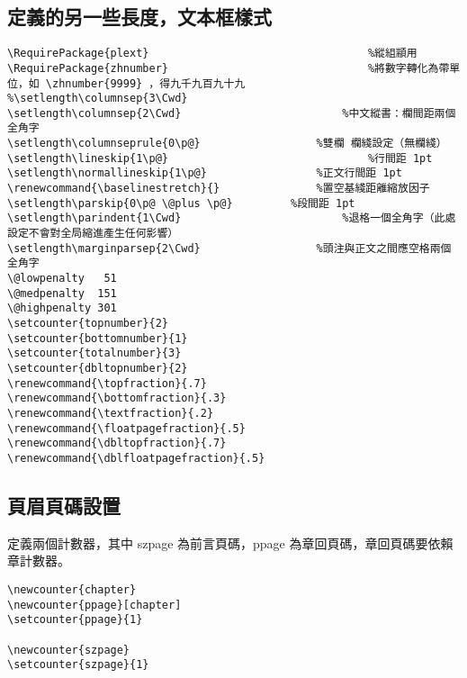 \subsection{定義的另一些長度，文本框樣式}

\begin{lstlisting}[firstnumber=325]
\RequirePackage{plext}									%縱組顓用
\RequirePackage{zhnumber}								%將數字轉化為帶單位，如 \zhnumber{9999} ，得九千九百九十九
%\setlength\columnsep{3\Cwd}
\setlength\columnsep{2\Cwd}							%中文縱書：欄間距兩個全角字
\setlength\columnseprule{0\p@}					%雙欄 欄綫設定（無欄綫）
\setlength\lineskip{1\p@}								%行間距 1pt
\setlength\normallineskip{1\p@}					%正文行間距 1pt
\renewcommand{\baselinestretch}{}				%置空基綫距離縮放因子
\setlength\parskip{0\p@ \@plus \p@}			%段間距 1pt
\setlength\parindent{1\Cwd}							%退格一個全角字（此處設定不會對全局縮進產生任何影響）
\setlength\marginparsep{2\Cwd}					%頭注與正文之間應空格兩個全角字
\@lowpenalty   51
\@medpenalty  151
\@highpenalty 301
\setcounter{topnumber}{2}
\setcounter{bottomnumber}{1}
\setcounter{totalnumber}{3}
\setcounter{dbltopnumber}{2}
\renewcommand{\topfraction}{.7}
\renewcommand{\bottomfraction}{.3}
\renewcommand{\textfraction}{.2}
\renewcommand{\floatpagefraction}{.5}
\renewcommand{\dbltopfraction}{.7}
\renewcommand{\dblfloatpagefraction}{.5}
\end{lstlisting}

\subsection{頁眉頁碼設置 }

\par 定義兩個計數器，其中 szpage 為前言頁碼，ppage 為章回頁碼，章回頁碼要依賴章計數器。
\begin{lstlisting}[firstnumber=351]
\newcounter{chapter}
\newcounter{ppage}[chapter]
\setcounter{ppage}{1}

\newcounter{szpage}
\setcounter{szpage}{1}
\end{lstlisting}


